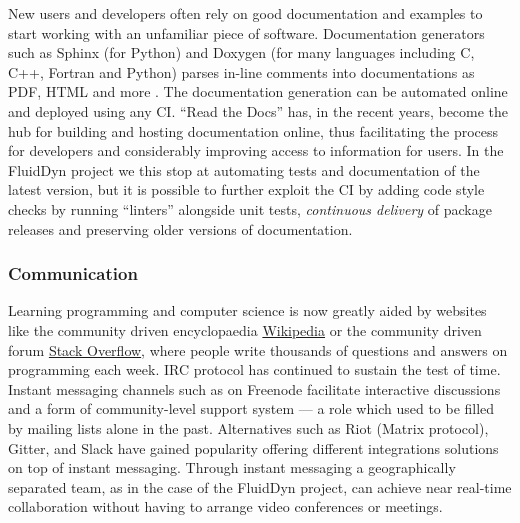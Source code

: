 New users and developers often rely on good documentation and examples to start
working with an unfamiliar piece of software. Documentation generators such as
Sphinx (for Python) and Doxygen (for many languages including C, C++, Fortran
and Python) parses in-line comments into documentations as PDF, HTML and more
\citep{lee_ten_2018}. The documentation generation can be automated online and
deployed using any CI. ``Read the Docs'' has, in the recent years, become the
hub for building and hosting documentation online, thus facilitating the
process for developers and considerably improving access to information for
users.
%
In the FluidDyn project we this stop at automating tests and documentation of
the latest version, but it is possible to further exploit the CI by adding code
style checks by running ``linters'' alongside unit tests, \emph{continuous
delivery} of package releases and preserving older versions of documentation.

\subsubsection{Communication}

%
Learning programming and computer science is now greatly aided by websites like
the community driven encyclopaedia \href{https://www.wikipedia.org/}{Wikipedia}
or the community driven forum \href{https://stackoverflow.com/}{Stack
Overflow}, where people write thousands of questions and answers on programming
each week. IRC protocol has continued to sustain the test of time. Instant
messaging channels such as  on Freenode facilitate
interactive discussions and a form of community-level support system --- a role
which used to be filled by mailing lists alone in the past. Alternatives such
as Riot (Matrix protocol), Gitter, and Slack have gained popularity offering
different integrations solutions on top of instant messaging.
%
Through instant messaging a geographically separated team, as in the case of
the FluidDyn project, can achieve near real-time collaboration without having
to arrange video conferences or meetings.



